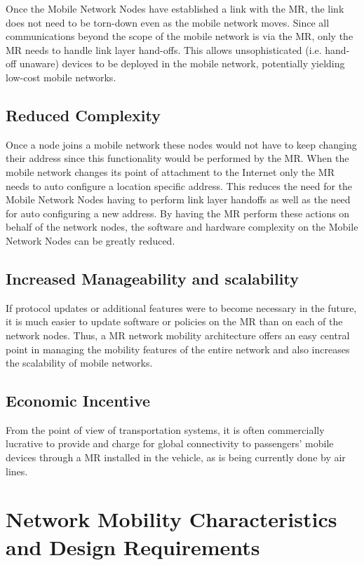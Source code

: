 Once the Mobile Network Nodes have established a link with the MR, the link
does not need to be torn-down even as the mobile network moves. Since all
communications beyond the scope of the mobile network is via the MR, only the
MR needs to handle link layer hand-offs. This allows unsophisticated (i.e.
hand-off unaware) devices to be deployed in the mobile network, potentially
yielding low-cost mobile networks.

\subsection{Reduced Complexity}

Once a node joins a mobile network these nodes would not have to keep changing
their address since this functionality would be performed by the MR. When the mobile network changes its point of attachment to the
Internet only the MR needs to auto configure a location specific address. This
reduces the need for the Mobile Network Nodes having to perform link layer
handoffs as well as the need for auto configuring a new address. By having the
MR perform these actions on behalf of the network nodes, the software and
hardware complexity on the Mobile Network Nodes can be greatly reduced.

\subsection{Increased Manageability and scalability}

If protocol updates or additional features were to become necessary in the
future, it is much easier to update software or policies on the MR than on
each of the network nodes. Thus, a MR network mobility architecture
offers an easy central point in managing the mobility features of the entire
network and also increases the scalability of mobile networks.

\subsection{Economic Incentive}

From the point of view of transportation systems, it is often commercially
lucrative to provide and charge for global connectivity to passengers' mobile
devices through a MR installed in the vehicle, as is being currently done by
air lines.

\section{Network Mobility Characteristics and Design Requirements}

